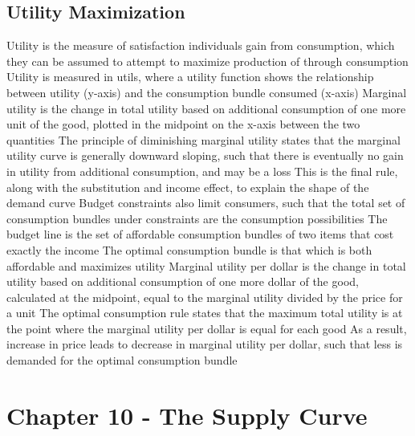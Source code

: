 \documentclass[11 pt, twoside]{article}
\newenvironment{outline*}
{
	\begin{outline}[enumerate]
	}
	{\end{outline}
}
\begin{document}
\subsection{Utility Maximization}
\begin{outline*}
\1 Utility is the measure of satisfaction individuals gain from consumption, which they can be assumed to attempt to maximize production of through consumption
\2 Utility is measured in utils, where a utility function shows the relationship between utility (y-axis) and the consumption bundle consumed (x-axis)
\2 Marginal utility is the change in total utility based on additional consumption of one more unit of the good, plotted in the midpoint on the x-axis between the two quantities
\1 The principle of diminishing marginal utility states that the marginal utility curve is generally downward sloping, such that there is eventually no gain in utility from additional consumption, and may be a loss
\2 This is the final rule, along with the substitution and income effect, to explain the shape of the demand curve
\1 Budget constraints also limit consumers, such that the total set of consumption bundles under constraints are the consumption possibilities
\2 The budget line is the set of affordable consumption bundles of two items that cost exactly the income
\1 The optimal consumption bundle is that which is both affordable and maximizes utility
\2 Marginal utility per dollar is the change in total utility based on additional consumption of one more dollar of the good, calculated at the midpoint, equal to the marginal utility divided by the price for a unit
\2 The optimal consumption rule states that the maximum total utility is at the point where the marginal utility per dollar is equal for each good
\2 As a result, increase in price leads to decrease in marginal utility per dollar, such that less is demanded for the optimal consumption bundle
\end{outline*}
\section{Chapter 10 - The Supply Curve}
\end{document}
